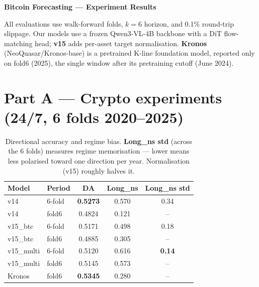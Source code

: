 \documentclass[11pt]{article}
\newcommand{\bb}[1]{\textcolor{best}{\textbf{#1}}}
\begin{document}
\begin{center}
{\Large\textbf{Bitcoin Forecasting --- Experiment Results}}
\end{center}

\medskip
All evaluations use walk-forward folds, $k{=}6$ horizon, and 0.1\% round-trip
slippage. Our models use a frozen Qwen3-VL-4B backbone with a DiT flow-matching
head; \textbf{v15} adds per-asset target normalisation. \textbf{Kronos}
(NeoQuasar/Kronos-base) is a pretrained K-line foundation model, reported only on
fold6 (2025), the single window after its pretraining cutoff (June 2024).

\section*{Part A --- Crypto experiments (24/7, 6 folds 2020--2025)}

\begin{table}[h]\centering
\caption{Directional accuracy and regime bias. \textbf{Long\_ns std} (across the
6 folds) measures regime memorisation --- lower means less polarised toward one
direction per year. Normalisation (v15) roughly halves it.}
\label{tab:dir}
\begin{tabular}{llccc}
\toprule
Model & Period & DA & Long\_ns & Long\_ns std \\
\midrule
v14        & 6-fold & \bb{0.5273} & 0.570 & 0.34 \\
v14        & fold6  & 0.4824 & 0.121 & -- \\
\midrule
v15\_btc   & 6-fold & 0.5171 & 0.498 & 0.18 \\
v15\_btc   & fold6  & 0.4885 & 0.305 & -- \\
\midrule
v15\_multi & 6-fold & 0.5120 & 0.616 & \bb{0.14} \\
v15\_multi & fold6  & 0.5145 & 0.573 & -- \\
\midrule
Kronos     & fold6  & \bb{0.5345} & 0.280 & -- \\
\bottomrule
\end{tabular}
\end{table}
\end{document}
